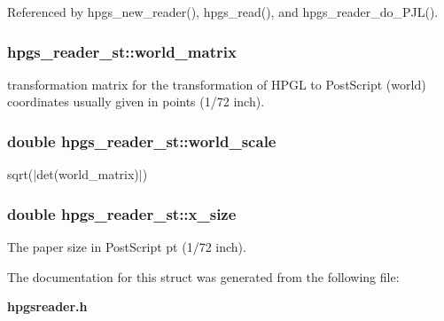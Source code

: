 Referenced by hpgs\_\-new\_\-reader(), hpgs\_\-read(), and hpgs\_\-reader\_\-do\_\-PJL().

\subsubsection[{world\_\-matrix}]{ {\bf hpgs\_\-reader\_\-st::world\_\-matrix}}\label{structhpgs__reader__st_a2153ebf8e7d6bdc7a091dbe2a32b94ad}
transformation matrix for the transformation of HPGL to PostScript (world) coordinates usually given in points (1/72 inch). 
\subsubsection[{world\_\-scale}]{\setlength{\rightskip}{0pt plus 5cm}double {\bf hpgs\_\-reader\_\-st::world\_\-scale}}\label{structhpgs__reader__st_a9c9337367da6b45d8723dda3b6b55929}
sqrt($|$det(world\_\-matrix)$|$) 
\subsubsection[{x\_\-size}]{\setlength{\rightskip}{0pt plus 5cm}double {\bf hpgs\_\-reader\_\-st::x\_\-size}}\label{structhpgs__reader__st_ad803c4e43446a11d580858270508d767}
The paper size in PostScript pt (1/72 inch). 

The documentation for this struct was generated from the following file:\begin{DoxyCompactItemize}
\item 
{\bf hpgsreader.h}\end{DoxyCompactItemize}
